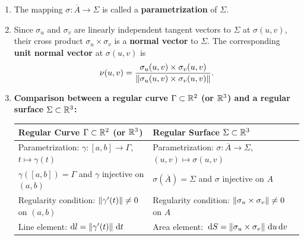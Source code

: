 \begin{remarque}
\begin{enumerate}[label=\textbf{\arabic*)}]
    \item The mapping $\sigma : \overline{A} \to \Sigma$ is called a \textbf{parametrization} of $\Sigma$.
    \item Since $\sigma_u$ and $\sigma_v$ are linearly independent tangent vectors to $\Sigma$ at $\sigma(u,v)$, their cross product $\sigma_u \times \sigma_v$ is a \textbf{normal vector} to $\Sigma$. The corresponding \textbf{unit normal vector} at $\sigma(u,v)$ is
    \[
        \nu(u,v) = \frac{\sigma_u(u,v) \times \sigma_v(u,v)}{\left\lVert\sigma_u(u,v) \times \sigma_v(u,v)\right\rVert}.
    \]
    \item \textbf{Comparison between a regular curve $\Gamma \subset \mathbb{R}^2$ (or $\mathbb{R}^3$) and a regular surface $\Sigma \subset \mathbb{R}^3$:}
    \begin{center}
    \renewcommand{\arraystretch}{1.35}
    \begin{tabular}{@{}ll@{}}
        \toprule
        \textbf{Regular Curve $\Gamma \subset \mathbb{R}^2$ (or $\mathbb{R}^3$)} & \textbf{Regular Surface $\Sigma \subset \mathbb{R}^3$} \\
        \midrule
        Parametrization: $\gamma : [a,b] \to \Gamma$, $t \mapsto \gamma(t)$ & Parametrization: $\sigma : \overline{A} \to \Sigma$, $(u,v) \mapsto \sigma(u,v)$ \\
        $\gamma([a,b]) = \Gamma$ and $\gamma$ injective on $(a,b)$ & $\sigma(\overline{A}) = \Sigma$ and $\sigma$ injective on $A$ \\
        Regularity condition: $\left\lVert\gamma'(t)\right\rVert \neq 0$ on $(a,b)$ & Regularity condition: $\left\lVert\sigma_u \times \sigma_v\right\rVert \neq 0$ on $A$ \\
        Line element: $\mathrm{d} l = \left\lVert\gamma'(t)\right\rVert \,\mathrm{d}t$ & Area element: $\,\mathrm{d}S = \left\lVert\sigma_u \times \sigma_v\right\rVert \,\mathrm{d} u\,\mathrm{d} v$ \\
        \bottomrule
    \end{tabular}
    \end{center}
\end{enumerate}
\end{remarque}

